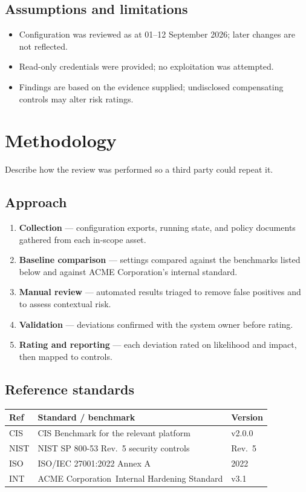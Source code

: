 \documentclass[11pt,a4paper]{article}
\newcommand{\ClientName}{ACME Corporation}
\newcommand{\AuditPeriod}{01--12 September 2026}
\begin{document}
\subsection{Assumptions and limitations}
\begin{itemize}
  \item Configuration was reviewed as at \AuditPeriod; later changes are not reflected.
  \item Read-only credentials were provided; no exploitation was attempted.
  \item Findings are based on the evidence supplied; undisclosed compensating controls may alter risk ratings.
\end{itemize}

\section{Methodology}
Describe how the review was performed so a third party could repeat it.

\subsection{Approach}
\begin{enumerate}
  \item \textbf{Collection} --- configuration exports, running state, and policy documents gathered from each in-scope asset.
  \item \textbf{Baseline comparison} --- settings compared against the benchmarks listed below and against \ClientName's internal standard.
  \item \textbf{Manual review} --- automated results triaged to remove false positives and to assess contextual risk.
  \item \textbf{Validation} --- deviations confirmed with the system owner before rating.
  \item \textbf{Rating and reporting} --- each deviation rated on likelihood and impact, then mapped to controls.
\end{enumerate}

\subsection{Reference standards}
\begin{longtable}{@{}l p{7.5cm} l@{}}
\toprule
\textbf{Ref} & \textbf{Standard / benchmark} & \textbf{Version} \\
\midrule\endhead
CIS & CIS Benchmark for the relevant platform & v2.0.0 \\
NIST & NIST SP 800-53 Rev.\ 5 security controls & Rev.\ 5 \\
ISO & ISO/IEC 27001:2022 Annex A & 2022 \\
INT & \ClientName\ Internal Hardening Standard & v3.1 \\
\bottomrule
\end{longtable}
\end{document}
